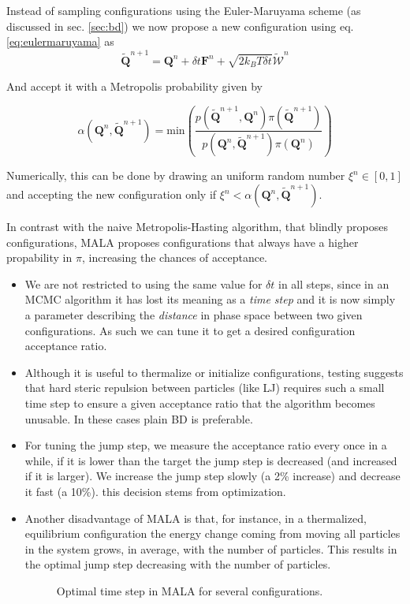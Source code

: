 \documentclass[ twoside,openright,titlepage,numbers=noenddot,%
headinclude,footinclude,cleardoublepage=empty,abstract=on,
BCOR=5mm,paper=a4,fontsize=11pt, dvipsnames
]{scrreprt}
\renewcommand{\vec}[1]{\bm{#1}}
\newcommand{\dt}{\delta t}
\newcommand{\kT}{k_B T}
\begin{document}
Instead of sampling configurations using the Euler-Maruyama scheme (as discussed in sec. \ref{sec:bd}) we now propose a new configuration using eq. \eqref{eq:eulermaruyama} as
\begin{equation}
  \widetilde{\vec{Q}}^{n+1} = \vec{Q}^n + \dt\vec{F}^n + \sqrt{2\kT\dt}\vec{\widetilde{\mathcal{W}}}^n
\end{equation}

And accept it with a Metropolis probability given by

\begin{equation}
  \alpha(\vec{Q}^n, \widetilde{\vec{Q}}^{n+1}) = \text{min}\left(\frac{p(\widetilde{\vec{Q}}^{n+1},\vec{Q}^{n})\pi(\widetilde{\vec{Q}}^{n+1})}{p(\vec{Q}^{n}, \widetilde{\vec{Q}}^{n+1})\pi(\vec{Q}^{n})}\right)
\end{equation}

Numerically, this can be done by drawing an uniform random number $\xi^n \in [0,1]$ and accepting the new configuration only if $\xi^n<\alpha(\vec{Q}^n, \widetilde{\vec{Q}}^{n+1})$.

In contrast with the naive Metropolis-Hasting algorithm, that blindly proposes configurations, MALA proposes configurations that always have a higher propability in $\pi$, increasing the chances of acceptance.

\begin{itemize}
\item We are not restricted to using the same value for $\dt$ in all steps, since in an MCMC algorithm it has lost its meaning as a \emph{time step} and it is now simply a parameter describing the \emph{distance} in phase space between two given configurations. As such we can tune it to get a desired configuration acceptance ratio.
\item Although it is useful to thermalize or initialize configurations, testing suggests that hard steric repulsion between particles (like LJ) requires such a small time step to ensure a given acceptance ratio that the algorithm becomes unusable. In these cases plain BD is preferable.
\item For tuning the jump step, we measure the acceptance ratio every once in a while, if it is lower than the target the jump step is decreased (and increased if it is larger). We increase the jump step slowly (a 2\% increase) and decrease it fast (a 10\%). this decision stems from optimization.
\item Another disadvantage of MALA is that, for instance, in a thermalized, equilibrium configuration the energy change coming from moving all particles in the system grows, in average, with the number of particles. This results in the optimal jump step decreasing with the number of particles.
  \begin{figure}[H]
    \label{fig:malastep}
    \centering    
    \label{fig:malastepsoft}
    \label{fig:malasteplj}
    \caption{Optimal time step in MALA for several configurations.}
  \end{figure}
  
\end{itemize}
\end{document}
